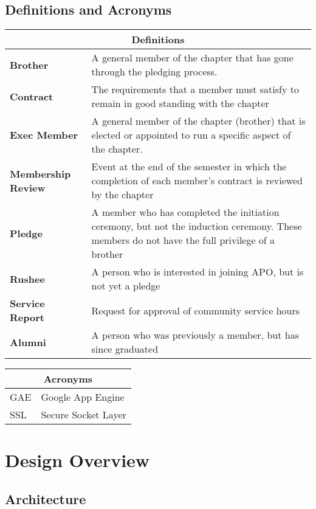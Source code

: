 \documentclass{article}
\begin{document}
\subsection{Definitions and Acronyms}

\begin{tabular}{p{}p{}}

\multicolumn{2}{c}{ {\bf Definitions} } \\ \hline
{\bf Brother} & A general member of the chapter that has gone through the pledging process. \\ \hline
{\bf Contract} & The requirements that a member must satisfy to remain in good standing with the chapter \\ \hline
{\bf Exec Member} & A general member of the chapter (brother) that is elected or appointed to run a specific aspect of the chapter. \\ \hline
{\bf Membership Review} & Event at the end of the semester in which the completion of each member's contract is reviewed by the chapter\\ \hline
{\bf Pledge} & A member who has completed the initiation ceremony, but not the induction ceremony. These members do not have the full privilege of a brother\\ \hline
{\bf Rushee} & A person who is interested in joining APO, but is not yet a pledge \\ \hline
{\bf Service Report} & Request for approval of community service hours\\ \hline
{\bf Alumni} & A person who was previously a member, but has since graduated\\ \hline
\end{tabular}

\begin{tabular}{p{}p{}}
\multicolumn{2}{c}{ {\bf Acronyms} } \\ \hline
GAE & Google App Engine \\ \hline
SSL & Secure Socket Layer \\ \hline
\end{tabular}

\section{Design Overview}

\subsection{Architecture}
\end{document}
